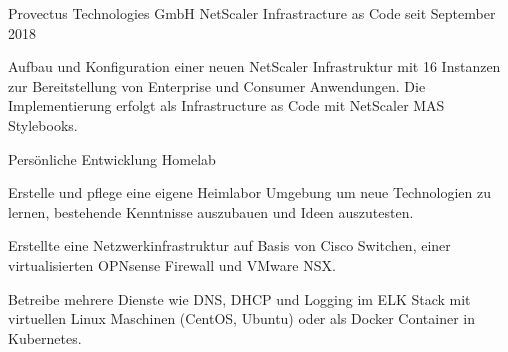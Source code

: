 


\begin{cventries}


\cventry
{Provectus Technologies GmbH} %
{NetScaler Infrastracture as Code} %
{} %
{seit September 2018} %
{ %
\begin{cvitems}
\item {Aufbau und Konfiguration einer neuen NetScaler Infrastruktur mit 16 Instanzen zur Bereitstellung von Enterprise und Consumer Anwendungen. Die Implementierung erfolgt als Infrastructure as Code mit NetScaler MAS Stylebooks.}
\end{cvitems}
}

\cventry
{Persönliche Entwicklung} %
{Homelab} %
{} %
{} %
{ %
{Erstelle und pflege eine eigene Heimlabor Umgebung um neue Technologien zu lernen, bestehende Kenntnisse auszubauen und Ideen auszutesten.}
\begin{cvitems}
\item {}
\item {Erstellte eine Netzwerkinfrastruktur auf Basis von Cisco Switchen, einer virtualisierten OPNsense Firewall und VMware NSX.}
\item {Betreibe mehrere Dienste wie DNS, DHCP und Logging im ELK Stack mit virtuellen Linux Maschinen (CentOS, Ubuntu) oder als Docker Container in Kubernetes. }
\end{cvitems}
}



\end{cventries}
